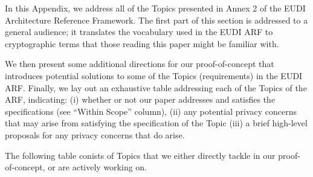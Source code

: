 



In this Appendix, we address all of the Topics presented in Annex 2 of the EUDI Architecture Reference Framework. 
The first part of this section is addressed to a general audience; it translates the vocabulary used in the EUDI ARF to cryptographic terms that those reading this paper might be familiar with.

We then present some additional directions for our proof-of-concept that introduces potential solutions to some of the Topics (requirements) in the EUDI ARF.
Finally, we lay out an exhaustive table addressing each of the Topics of the ARF, indicating:
(i) whether or not our paper addresses and satisfies the specifications (see ``Within Scope'' column),
(ii) any potential privacy concerns that may arise from satisfying the specification of the Topic
(iii) a brief high-level proposals for any privacy concerns that do arise.

The following table conists of Topics that we either directly tackle in our proof-of-concept, or are actively working on. 

